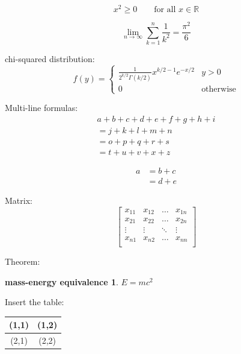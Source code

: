 \documentclass[12pt,hyperref,a4paper,UTF8]{article}
\begin{document}
\begin{equation}\label{eq:3}
    x^2 \geq 0 \qquad \text{for all } x \in \mathbb{R}
\end{equation}

\begin{equation}\label{eq:4}
    \lim_{n \to \infty}
    \sum_{k=1}^n \frac{1}{k^2}
    = \frac{\pi^2}{6}
\end{equation}

chi-squared distribution:
\begin{equation}\label{eq:5}
    f(y) =
    \begin{cases}
        \frac{1}{2^{k/2}\Gamma(k/2)} x^{k/2-1} e^{-x/2} & y>0              \\
        0                                               & \text{otherwise}
    \end{cases}
\end{equation}

Multi-line formulas:
\begin{multline} \label{eq:6}
    a + b + c + d + e + f
    + g + h + i \\
    = j + k + l + m + n\\
    = o + p + q + r + s\\
    = t + u + v + x + z
\end{multline}

\begin{align} \label{eq:7}
    a & = b + c \\
      & = d + e
\end{align}

Matrix:
\begin{equation} \label{eq:8}
    \begin{bmatrix}
        x_{11} & x_{12} & \ldots & x_{1n} \\
        x_{21} & x_{22} & \ldots & x_{2n} \\
        \vdots & \vdots & \ddots & \vdots \\
        x_{n1} & x_{n2} & \ldots & x_{nn} \\
    \end{bmatrix}
\end{equation}

Theorem:
\newtheorem{mass-energy equivalence}{mass-energy equivalence}[section]
\begin{mass-energy equivalence} \label{thm:1}
$E = mc^2$
\end{mass-energy equivalence}

Insert the table:
\begin{table}[h]
    \begin{tabular}{|c|c|}%
        \hline  %
        (1,1) & (1,2) \\
        \hline  %
        (2,1) & (2,2) \\
        \hline %
    \end{tabular}
\end{table}
\end{document}

